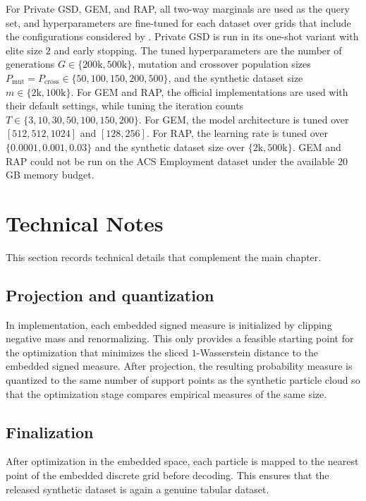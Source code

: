 For Private GSD, GEM, and RAP, all two-way marginals are used as the query set, and hyperparameters are fine-tuned for each dataset over grids that include the configurations considered by \citet{pmlr-v202-liu23ag}. Private GSD is run in its one-shot variant with elite size \(2\) and early stopping. The tuned hyperparameters are the number of generations \(G \in \{200\mathrm{k}, 500\mathrm{k}\}\), mutation and crossover population sizes \(P_{\mathrm{mut}} = P_{\mathrm{cross}} \in \{50, 100, 150, 200, 500\}\), and the synthetic dataset size \(m \in \{2\mathrm{k}, 100\mathrm{k}\}\). For GEM and RAP, the official implementations are used with their default settings, while tuning the iteration counts \(T \in \{3, 10, 30, 50, 100, 150, 200\}\). For GEM, the model architecture is tuned over \([512, 512, 1024]\) and \([128, 256]\). For RAP, the learning rate is tuned over \(\{0.0001, 0.001, 0.03\}\) and the synthetic dataset size over \(\{2\mathrm{k}, 500\mathrm{k}\}\). GEM and RAP could not be run on the ACS Employment dataset under the available \(20\) GB memory budget.

\clearpage
\section{Technical Notes}
\label{app:privpgd-technical}

This section records technical details that complement the main chapter.

\subsection{Projection and quantization}
In implementation, each embedded signed measure is initialized by clipping negative mass and renormalizing. This only provides a feasible starting point for the optimization that minimizes the sliced \(1\)-Wasserstein distance to the embedded signed measure. After projection, the resulting probability measure is quantized to the same number of support points as the synthetic particle cloud so that the optimization stage compares empirical measures of the same size.

\subsection{Finalization}
After optimization in the embedded space, each particle is mapped to the nearest point of the embedded discrete grid before decoding. This ensures that the released synthetic dataset is again a genuine tabular dataset.

